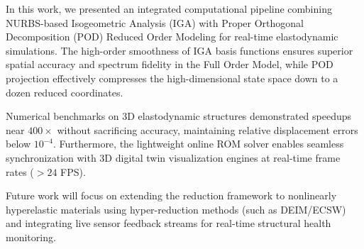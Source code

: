 In this work, we presented an integrated computational pipeline combining NURBS-based Isogeometric Analysis (IGA) with Proper Orthogonal Decomposition (POD) Reduced Order Modeling for real-time elastodynamic simulations. The high-order smoothness of IGA basis functions ensures superior spatial accuracy and spectrum fidelity in the Full Order Model, while POD projection effectively compresses the high-dimensional state space down to a dozen reduced coordinates.

Numerical benchmarks on 3D elastodynamic structures demonstrated speedups near $400\times$ without sacrificing accuracy, maintaining relative displacement errors below $10^{-4}$. Furthermore, the lightweight online ROM solver enables seamless synchronization with 3D digital twin visualization engines at real-time frame rates ($>24$ FPS).

Future work will focus on extending the reduction framework to nonlinearly hyperelastic materials using hyper-reduction methods (such as DEIM/ECSW) and integrating live sensor feedback streams for real-time structural health monitoring.
